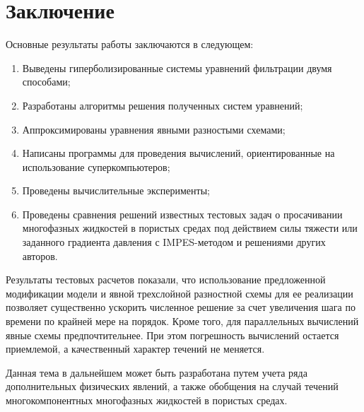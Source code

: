 \chapter*{Заключение}                       %


Основные результаты работы заключаются в следующем:
\begin{enumerate}
 \item Выведены гиперболизированные системы уравнений фильтрации двумя способами;
 \item Разработаны алгоритмы решения полученных систем уравнений;
 \item Аппроксимированы уравнения явными разностыми схемами;
 \item Написаны программы для проведения вычислений, ориентированные на использование суперкомпьютеров;
 \item Проведены вычислительные эксперименты;
 \item Проведены сравнения решений известных тестовых задач о просачивании многофазных жидкостей в пористых средах под действием силы тяжести или заданного градиента давления с IMPES-методом и решениями других авторов.
\end{enumerate}

Результаты тестовых расчетов показали, что использование предложенной модификации модели и явной трехслойной разностной
схемы для ее реализации позволяет существенно ускорить численное решение за счет увеличения шага по времени
по крайней мере на порядок. Кроме того, для параллельных вычислений явные схемы предпочтительнее.
При этом погрешность вычислений остается приемлемой, а качественный характер течений не меняется.

Данная тема в дальнейшем может быть разработана путем учета ряда дополнительных физических явлений, а также обобщения на случай течений многокомпонентных многофазных жидкостей в пористых средах.
